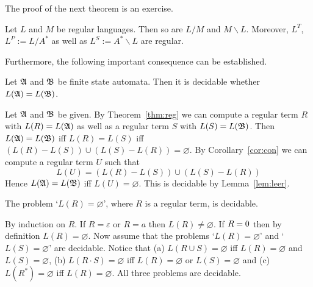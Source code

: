 \noindent
The proof of the next theorem is an exercise.
\begin{thm}
\label{thm:abschluss}
Let $L$ and $M$ be regular languages. Then so are $L/M$ and
$M\backslash L$. Moreover, $L^T$, $L^P := L/A^{\ast}$
as well as $L^S := A^{\ast}\backslash L$ are regular.
\end{thm}
Furthermore, the following important consequence can be
established.
\begin{thm}
Let $\mathfrak{A}$ and $\mathfrak{B}$ be finite state automata.
Then it is decidable whether $L(\mathfrak{A}) = L(\mathfrak{B})$.
\end{thm}
\proofbeg
Let $\mathfrak{A}$ and $\mathfrak{B}$ be given. By Theorem~\ref{thm:reg}
we can compute a regular term $R$ with $L(R) = L(\mathfrak{A})$
as well as a regular term $S$ with $L(S) = L(\mathfrak{B})$.
Then $L(\mathfrak{A}) = L(\mathfrak{B})$ iff $L(R) = L(S)$
iff $(L(R) - L(S)) \cup (L(S) - L(R))
= \varnothing$. By Corollary~\ref{cor:con} we can compute
a regular term $U$ such that 
\begin{equation}
L(U) = (L(R) - L(S)) \cup (L(S) - L(R))
\end{equation}
Hence $L(\mathfrak{A}) = L(\mathfrak{B})$ iff $L(U) = \varnothing$. This is 
decidable by Lemma~\ref{lem:leer}.
\proofend
\begin{lem}
\label{lem:leer}
The problem `$L(R) = \varnothing$', where $R$ is a regular 
term, is decidable.
\end{lem}
\proofbeg
By induction on $R$. If $R = \varepsilon$
or $R = a$ then $L(R) \neq  \varnothing$. If $R = 0$
then by definition $L(R) = \varnothing$. Now assume that the
problems `$L(R) = \varnothing$' and `$L(S) = \varnothing$'
are decidable. Notice that (a) $L(R \cup S) = \varnothing$ iff
$L(R) = \varnothing$ and $L(S) = \varnothing$, 
(b) $L(R \cdot S) = \varnothing$ iff $L(R) = \varnothing$ or 
$L(S) = \varnothing$ and (c) $L(R^{\ast}) = \varnothing$ iff
$L(R) = \varnothing$. All three problems are decidable.
\proofend

